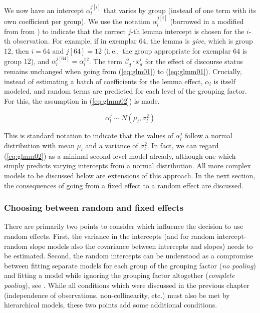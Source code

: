 \documentclass[a4paper,12pt]{article}
\newcommand{\ie}{i.\,e.,\ }
\begin{document}
We now have an intercept $\alpha_l^{j[i]}$ that varies by group (instead of one term with its own coefficient per group).
We use the notation $\alpha_l^{j[i]}$ (borrowed in a modified from from \citealt{GelmanHill2006}) to indicate that the correct $j$-th lemma intercept is chosen for the $i$-th observation.
For example, if in exemplar $64$, the lemma is \textit{give}, which is group $12$, then $i=64$ and $j[64]=12$ (\ie the group appropriate for exemplar $64$ is group $12$), and $\alpha_l^{j[64]}=\alpha_l^{12}$.
The term $\beta_d\cdot x_d^i$ for the effect of discourse status remains unchanged when going from (\ref{eq:glm01}) to (\ref{eq:glmm01}).
Crucially, instead of estimating a batch of coefficients for the lemma effect, $\alpha_l$ is itself modeled, and random terms are predicted for each level of the grouping factor.
For this, the assumption in (\ref{eq:glmm02}) is made.

\begin{equation}
  \alpha_l^j\sim N(\mu_l,\sigma_l^2)
  \label{eq:glmm02}
\end{equation}

This is standard notation to indicate that the values of $\alpha_l^j$ follow a normal distribution with mean $\mu_l$ and a variance of $\sigma_l^2$.
In fact, we can regard (\ref{eq:glmm02}) as a minimal second-level model already, although one which simply predicts varying intercepts from a normal distribution.
All more complex models to be discussed below are extensions of this approach.
In the next section, the consequences of going from a fixed effect to a random effect are discussed.

\subsubsection{Choosing between random and fixed effects}
\label{sec:choosingbetweenrandomandfixedeffects}

There are primarily two points to consider which influence the decision to use random effects.
First, the variance in the intercepts (and for random intercept-random slope models also the covariance between intercepts and slopes) needs to be estimated.
Second, the random intercepts can be understood as a compromise between fitting separate models for each group of the grouping factor (\textit{no pooling}) and fitting a model while ignoring the grouping factor altogether (\textit{complete pooling}), see \citet{GelmanHill2006}.
While all conditions which were discussed in the previous chapter (independence of observations, non-collinearity, etc.) must also be met by hierarchical models, these two points add some additional conditions.
\end{document}
